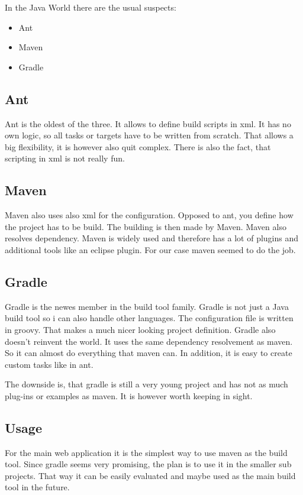 \documentclass[paper=a4,twoside=false,BCOR=0mm,DIV=calc,fontsize=12pt]{scrartcl}
\begin{document}
In the Java World there are the usual suspects:
\begin{itemize}
 \item Ant
 \item Maven
 \item Gradle
\end{itemize}

\subsection{Ant}
Ant is the oldest of the three. It allows to define build scripts in xml. 
It has no own logic, so all tasks or targets have to be written from scratch.
That allows a big flexibility, it is however also quit complex. There is also the fact,
that scripting in xml is not really fun.


\subsection{Maven}
Maven also uses also xml for the configuration. Opposed to ant, you define how the project has to be build. The building is then
made by Maven. Maven also resolves dependency. Maven is widely used and therefore has a lot of plugins and additional tools like an eclipse plugin. For our case maven seemed to do the job.


\subsection{Gradle}
Gradle is the newes member in the build tool family. Gradle is not just a Java build tool so i can also handle other languages. The configuration file is written in groovy. That makes a much nicer looking project definition.
Gradle also doesn't reinvent the world. It uses the same dependency resolvement as maven. So it can almost do everything that maven can. In addition, it is easy to create custom tasks like in ant.

The downside is, that gradle is still a very young project and has not as much plug-ins or examples as maven. It is however worth keeping in sight.

\subsection{Usage}
For the main web application it is the simplest way to use maven as the build tool. Since gradle seems very promising, the plan is to use it in the
smaller sub projects. That way it can be easily evaluated and maybe used as the main build tool in the future.
\end{document}

